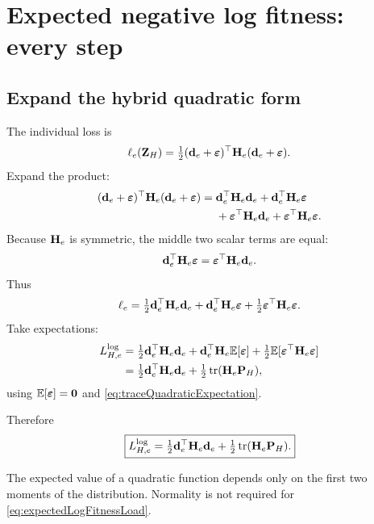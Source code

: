 \chapter{Expected negative log fitness: every step}

\section{Expand the hybrid quadratic form}

The individual loss is
\begin{equation}
\ell_e(\mathbf Z_H)
=\tfrac12(\mathbf d_e+\boldsymbol\varepsilon)^\top
\mathbf{H}_e
(\mathbf d_e+\boldsymbol\varepsilon).
\end{equation}
Expand the product:
\begin{align}
(\mathbf d_e+\boldsymbol\varepsilon)^\top\mathbf{H}_e(\mathbf d_e+\boldsymbol\varepsilon)
={}&\mathbf d_e^\top\mathbf{H}_e\mathbf d_e
+\mathbf d_e^\top\mathbf{H}_e\boldsymbol\varepsilon\\
&+\boldsymbol\varepsilon^\top\mathbf{H}_e\mathbf d_e
+\boldsymbol\varepsilon^\top\mathbf{H}_e\boldsymbol\varepsilon.
\end{align}
Because \(\mathbf{H}_e\) is symmetric, the middle two scalar terms are equal:
\begin{equation}
\mathbf d_e^\top\mathbf{H}_e\boldsymbol\varepsilon
=\boldsymbol\varepsilon^\top\mathbf{H}_e\mathbf d_e.
\end{equation}
Thus
\begin{equation}
\ell_e
=\tfrac12\mathbf d_e^\top\mathbf{H}_e\mathbf d_e
+\mathbf d_e^\top\mathbf{H}_e\boldsymbol\varepsilon
+\tfrac12\boldsymbol\varepsilon^\top\mathbf{H}_e\boldsymbol\varepsilon.
\end{equation}
Take expectations:
\begin{align}
L^{\log}_{H,e}
={}&\tfrac12\mathbf d_e^\top\mathbf{H}_e\mathbf d_e
+\mathbf d_e^\top\mathbf{H}_e\mathbb E[\boldsymbol\varepsilon]
+\tfrac12\mathbb E[\boldsymbol\varepsilon^\top\mathbf{H}_e\boldsymbol\varepsilon]\\
={}&\tfrac12\mathbf d_e^\top\mathbf{H}_e\mathbf d_e
+\tfrac12\operatorname{tr}(\mathbf{H}_e\mathbf{P}_H),
\end{align}
using \(\mathbb E[\boldsymbol\varepsilon]=\mathbf{0}\) and \cref{eq:traceQuadraticExpectation}.

Therefore
\begin{equation}
\boxed{
L^{\log}_{H,e}
=\tfrac12\mathbf d_e^\top\mathbf{H}_e\mathbf d_e
+\tfrac12\operatorname{tr}(\mathbf{H}_e\mathbf{P}_H).}
\label{eq:expectedLogFitnessLoad}
\end{equation}

\begin{mathteach}
The expected value of a quadratic function depends only on the first two moments of the distribution. Normality is not required for \cref{eq:expectedLogFitnessLoad}.
\end{mathteach}

